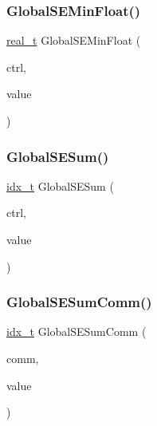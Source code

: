 \mbox{\label{a00344_ab1ebf8b04ebb66e2a28e603f249d9ca8}} 
\subsubsection{\texorpdfstring{Global\+S\+E\+Min\+Float()}{GlobalSEMinFloat()}}
{\footnotesize\ttfamily \hyperlink{a00876_a1924a4f6907cc3833213aba1f07fcbe9}{real\+\_\+t} Global\+S\+E\+Min\+Float (\begin{DoxyParamCaption}\item[{\hyperlink{a00742}{ctrl\+\_\+t} $\ast$}]{ctrl,  }\item[{\hyperlink{a00876_a1924a4f6907cc3833213aba1f07fcbe9}{real\+\_\+t}}]{value }\end{DoxyParamCaption})}

\mbox{\label{a00344_a3436cdd78aad4086a1df7cd254a7f2f9}} 
\subsubsection{\texorpdfstring{Global\+S\+E\+Sum()}{GlobalSESum()}}
{\footnotesize\ttfamily \hyperlink{a00876_aaa5262be3e700770163401acb0150f52}{idx\+\_\+t} Global\+S\+E\+Sum (\begin{DoxyParamCaption}\item[{\hyperlink{a00742}{ctrl\+\_\+t} $\ast$}]{ctrl,  }\item[{\hyperlink{a00876_aaa5262be3e700770163401acb0150f52}{idx\+\_\+t}}]{value }\end{DoxyParamCaption})}

\mbox{\label{a00344_a10c4011516ef455e5c128a4112cf2cea}} 
\subsubsection{\texorpdfstring{Global\+S\+E\+Sum\+Comm()}{GlobalSESumComm()}}
{\footnotesize\ttfamily \hyperlink{a00876_aaa5262be3e700770163401acb0150f52}{idx\+\_\+t} Global\+S\+E\+Sum\+Comm (\begin{DoxyParamCaption}\item[{M\+P\+I\+\_\+\+Comm}]{comm,  }\item[{\hyperlink{a00876_aaa5262be3e700770163401acb0150f52}{idx\+\_\+t}}]{value }\end{DoxyParamCaption})}

